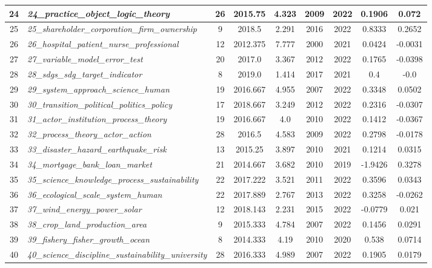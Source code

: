 \documentclass[12pt]{article}
\begin{document}
\begin{landscape}
\begin{scriptsize}
\begin{longtable}{|>{\scriptsize}c|p{6cm}|c|c|c|c|c|c|c|}
24 & \textit{24\_practice\_object\_logic\_theory} & 26 & 2015.75 & 4.323 & 2009 & 2022 & 0.1906 & 0.072 \\ \hline
25 & \textit{25\_shareholder\_corporation\_firm\_ownership} & 9 & 2018.5 & 2.291 & 2016 & 2022 & 0.8333 & 0.2652 \\ \hline
26 & \textit{26\_hospital\_patient\_nurse\_professional} & 12 & 2012.375 & 7.777 & 2000 & 2021 & 0.0424 & -0.0031 \\ \hline
27 & \textit{27\_variable\_model\_error\_test} & 20 & 2017.0 & 3.367 & 2012 & 2022 & 0.1765 & -0.0398 \\ \hline
28 & \textit{28\_sdgs\_sdg\_target\_indicator} & 8 & 2019.0 & 1.414 & 2017 & 2021 & 0.4 & -0.0 \\ \hline
29 & \textit{29\_system\_approach\_science\_human} & 19 & 2016.667 & 4.955 & 2007 & 2022 & 0.3348 & 0.0502 \\ \hline
30 & \textit{30\_transition\_political\_politics\_policy} & 17 & 2018.667 & 3.249 & 2012 & 2022 & 0.2316 & -0.0307 \\ \hline
31 & \textit{31\_actor\_institution\_process\_theory} & 19 & 2016.667 & 4.0 & 2010 & 2022 & 0.1412 & -0.0367 \\ \hline
32 & \textit{32\_process\_theory\_actor\_action} & 28 & 2016.5 & 4.583 & 2009 & 2022 & 0.2798 & -0.0178 \\ \hline
33 & \textit{33\_disaster\_hazard\_earthquake\_risk} & 13 & 2015.25 & 3.897 & 2010 & 2021 & 0.1214 & 0.0315 \\ \hline
34 & \textit{34\_mortgage\_bank\_loan\_market} & 21 & 2014.667 & 3.682 & 2010 & 2019 & -1.9426 & 0.3278 \\ \hline
35 & \textit{35\_science\_knowledge\_process\_sustainability} & 22 & 2017.222 & 3.521 & 2011 & 2022 & 0.3596 & 0.0343 \\ \hline
36 & \textit{36\_ecological\_scale\_system\_human} & 22 & 2017.889 & 2.767 & 2013 & 2022 & 0.3258 & -0.0262 \\ \hline
37 & \textit{37\_wind\_energy\_power\_solar} & 12 & 2018.143 & 2.231 & 2015 & 2022 & -0.0779 & 0.021 \\ \hline
38 & \textit{38\_crop\_land\_production\_area} & 9 & 2015.333 & 4.784 & 2007 & 2022 & 0.1456 & 0.0291 \\ \hline
39 & \textit{39\_fishery\_fisher\_growth\_ocean} & 8 & 2014.333 & 4.19 & 2010 & 2020 & 0.538 & 0.0714 \\ \hline
40 & \textit{40\_science\_discipline\_sustainability\_university} & 28 & 2016.333 & 4.989 & 2007 & 2022 & 0.1905 & 0.0179 \\ \hline

\end{longtable}
\end{scriptsize}
\end{landscape}
\end{document}

